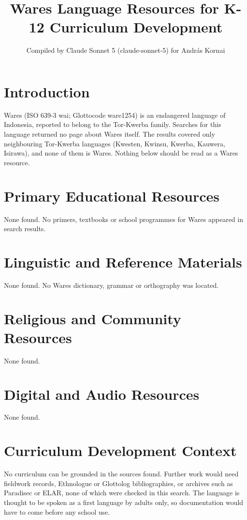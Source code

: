 \documentclass[12pt]{article}
\title{Wares Language Resources for K-12 Curriculum Development}
\author{Compiled by Claude Sonnet 5 (claude-sonnet-5) for Andr\'as Kornai}
\date{}
\begin{document}
\maketitle

\section{Introduction}
Wares (ISO 639-3 wai; Glottocode ware1254) is an endangered language of Indonesia, reported to belong to the Tor-Kwerba family. Searches for this language returned no page about Wares itself. The results covered only neighbouring Tor-Kwerba languages (Kwesten, Kwinsu, Kwerba, Kauwera, Isirawa), and none of them is Wares. Nothing below should be read as a Wares resource.

\section{Primary Educational Resources}
None found. No primers, textbooks or school programmes for Wares appeared in search results.

\section{Linguistic and Reference Materials}
None found. No Wares dictionary, grammar or orthography was located.

\section{Religious and Community Resources}
None found.

\section{Digital and Audio Resources}
None found.

\section{Curriculum Development Context}
No curriculum can be grounded in the sources found. Further work would need fieldwork records, Ethnologue or Glottolog bibliographies, or archives such as Paradisec or ELAR, none of which were checked in this search. The language is thought to be spoken as a first language by adults only, so documentation would have to come before any school use.
\end{document}
